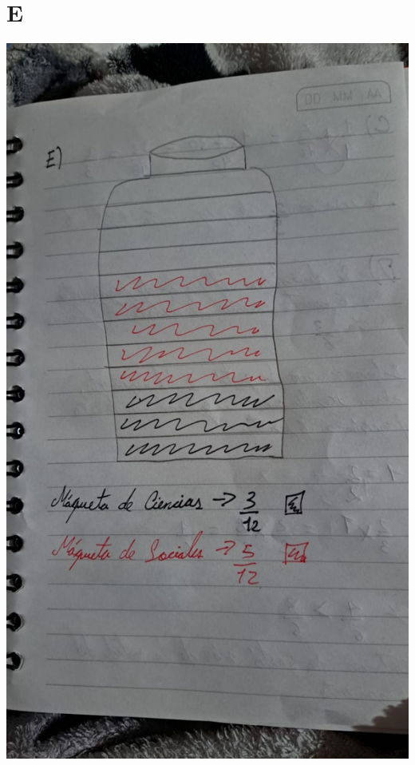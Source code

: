 \documentclass[12pt, letterpaper, twoside]{article}
\begin{document}
\section*{E}
\includegraphics[scale=0.4]{lastpoint.jpg}
\end{document}
